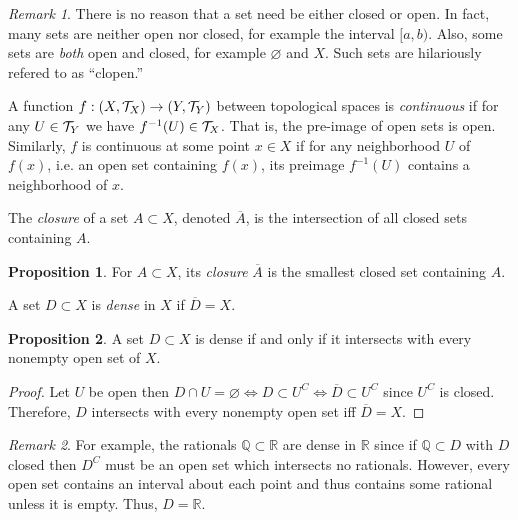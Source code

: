 \documentclass{article}
\newcommand{\Q}{\mathbb{Q}}
\newcommand{\R}{\mathbb{R}}
\newenvironment{definition}[1][Definition:]{\begin{trivlist}
\item[\hskip \labelsep {\bfseries #1}]}{\end{trivlist}}
\theoremstyle{theorem}
\theoremstyle{definition}
\theoremstyle{definition}
\newtheorem*{proposition}{Proposition}
\theoremstyle{remark}
\theoremstyle{definition}
\theoremstyle{remark}
\newtheorem{remark}{Remark}[subsection]
\begin{document}
\begin{remark}
There is no reason that a set need be either closed or open. In fact, many sets are neither open nor closed, for example the interval $[a, b)$. Also, some sets are \textit{both} open and closed, for example $\varnothing$ and $X$. Such sets are hilariously refered to as ``clopen.''  
\end{remark}

\begin{definition}
A function $f : (X, \mathcal{T}_X) \to (Y, \mathcal{T}_Y)$ between topological spaces is \textit{continuous} if for any $U \in \mathcal{T}_Y$ we have $f^{-1}(U) \in \mathcal{T}_X$. That is, the pre-image of open sets is open. Similarly, $f$ is continuous at some point $x \in X$ if for any neighborhood $U$ of $f(x)$, i.e. an open set containing $f(x)$, its preimage $f^{-1}(U)$ contains a neighborhood of $x$.  
\end{definition}

\begin{definition}
The \textit{closure} of a set $A \subset X$, denoted $\overline{A}$, is the intersection of all closed sets containing $A$. 
\end{definition}

\begin{proposition}
For $A \subset X$, its \textit{closure} $\overline{A}$ is the smallest closed set containing $A$. 
\end{proposition}

\begin{definition}
A set $D \subset X$ is \textit{dense} in $X$ if $\overline{D} = X$.
\end{definition}

\begin{proposition}
A set $D \subset X$ is dense if and only if it intersects with every nonempty open set of $X$. 
\end{proposition}

\begin{proof}
Let $U$ be open then $D \cap U = \varnothing \iff D \subset U^C \iff \overline{D} \subset U^C$ since $U^C$ is closed. Therefore, $D$ intersects with every nonempty open set iff $\overline{D} = X$.  
\end{proof}

\begin{remark}
For example, the rationals $\Q \subset \R$ are dense in $\R$ since if $\Q \subset D$ with $D$ closed then $D^C$ must be an open set which intersects no rationals. However, every open set contains an interval about each point and thus contains some rational unless it is empty. Thus, $D = \R$. 
\end{remark}
\end{document}
